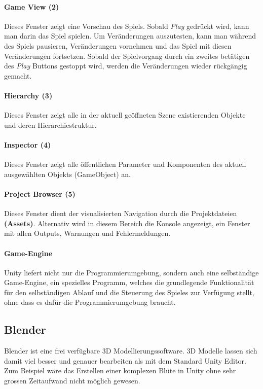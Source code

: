\paragraph{Game View (2)}
Dieses Fenster zeigt eine Vorschau des Spiels.
Sobald \textit{Play} gedrückt wird, kann man darin das Spiel spielen.
Um Veränderungen auszutesten, kann man während des Spiels pausieren, Veränderungen vornehmen und das Spiel mit diesen Veränderungen fortsetzen. Sobald der Spielvorgang durch ein zweites betätigen des \textit{Play} Buttons gestoppt wird, werden die Veränderungen wieder rückgängig gemacht.

\paragraph{Hierarchy (3)}
Dieses Fenster zeigt alle in der aktuell geöffneten Szene existierenden Objekte und deren Hierarchiestruktur.

\paragraph{Inspector (4)}
Dieses Fenster zeigt alle öffentlichen Parameter und Komponenten des aktuell ausgewählten Objekts (GameObject) an.

\paragraph{Project Browser (5)}
Dieses Fenster dient der visualisierten Navigation durch die Projektdateien \textbf{(Assets)}.
Alternativ wird in diesem Bereich die Konsole angezeigt, ein Fenster mit allen Outputs, Warnungen und Fehlermeldungen.

\paragraph{Game-Engine}
Unity liefert nicht nur die Programmierumgebung, sondern auch eine selbständige Game-Engine, ein spezielles Programm, welches die grundlegende Funktionalität für den selbständigen Ablauf und die Steuerung des Spieles zur Verfügung stellt, ohne dass es dafür die Programmierumgebung braucht.


\subsection{Blender}
Blender ist eine frei verfügbare 3D Modellierungssoftware.
3D Modelle lassen sich damit viel besser und genauer bearbeiten als mit dem Standard Unity Editor. 
Zum Beispiel wäre das Erstellen einer komplexen Blüte in Unity ohne sehr grossen Zeitaufwand nicht möglich gewesen.

